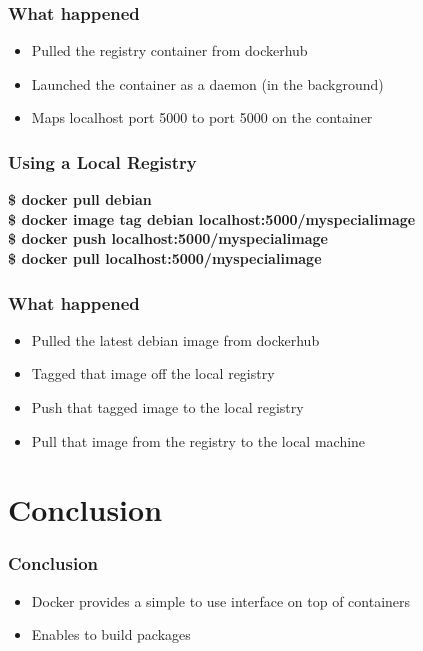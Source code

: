 \documentclass[aspectratio=169,11pt,hyperref={colorlinks=true}]{beamer}
\begin{document}
\begin{frame}
    \frametitle{What happened}
    \begin{itemize}
        \item Pulled the registry container from dockerhub
        \item Launched the container as a daemon (in the background)
        \item Maps localhost port 5000 to port 5000 on the container
    \end{itemize}
\end{frame}

\begin{frame}
    \frametitle{Using a Local Registry}
    \textbf{\$ docker pull debian} \\
    \textbf{\$ docker image tag debian localhost:5000/myspecialimage} \\
    \textbf{\$ docker push localhost:5000/myspecialimage} \\
    \textbf{\$ docker pull localhost:5000/myspecialimage}
\end{frame}

\begin{frame}
    \frametitle{What happened}
    \begin{itemize}
        \item Pulled the latest debian image from dockerhub
        \item Tagged that image off the local registry
        \item Push that tagged image to the local registry
        \item Pull that image from the registry to the local machine
    \end{itemize}
\end{frame}

\section{Conclusion}
\begin{frame}
    \frametitle{Conclusion}
    \begin{itemize}
        \item Docker provides a simple to use interface on top of containers
        \item Enables to build packages
    \end{itemize}
\end{frame}
\end{document}
